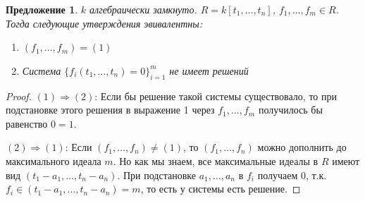 \documentclass{article}
\newtheorem*{proposition}{Предложение}
\theoremstyle{definition}
\theoremstyle{remark}
\newcommand{\Ra}{\Rightarrow}
\begin{document}
\begin{proposition}
    $k$ алгебраически замкнуто. $R = k [t_1, \hdots, t_n]$, $f_1, \hdots, f_m \in R$. Тогда следующие утверждения эвивалентны:
    \begin{enumerate}
        \item $(f_1, \hdots, f_m) = (1)$
        \item Система $\{f_i(t_1, \hdots, t_n) = 0\}_{i = 1}^m$ не имеет решений
    \end{enumerate}
\end{proposition}
\begin{proof}
    $(1) \Ra (2)$: Если бы решение такой системы существовало, то при подстановке этого решения в выражение 1 через $f_1, \hdots, f_m$ получилось бы равенство $0 = 1$.

    $(2) \Ra (1)$: Если $(f_1, \hdots, f_n) \neq (1)$, то $(f_1, \hdots, f_n)$ можно дополнить до максимального идеала $m$. Но как мы знаем, все максимальные идеалы в $R$ имеют вид $(t_1 - a_1,\hdots, t_n - a_n)$. При подстановке $a_1, \hdots, a_n$ в $f_i$ получаем 0, т.к. $f_i \in (t_1 - a_1,\hdots, t_n - a_n) = m$, то есть у системы есть решение.
\end{proof}
\end{document}
